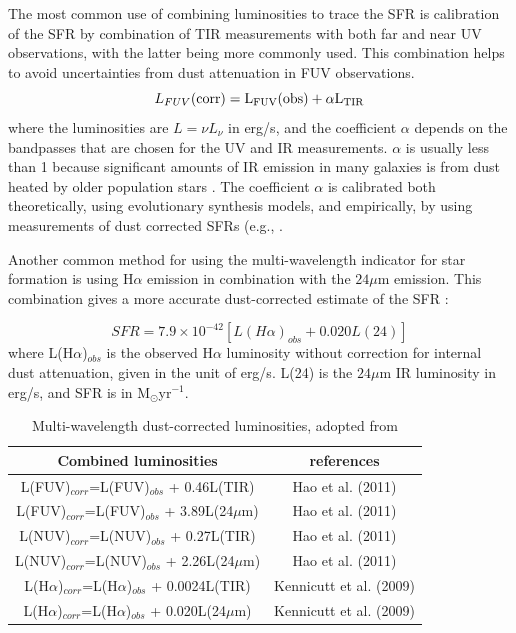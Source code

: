 The most common use of combining luminosities to trace the SFR is calibration of the SFR by combination of TIR measurements with both far and near UV observations, with the latter being more commonly used. This combination helps to avoid uncertainties from dust attenuation in FUV observations.
\begin{equation}
L_{FUV}(\rm corr) = L_{FUV}(\rm obs) + \alpha L_{\rm TIR}
\end{equation}
where the luminosities are $L = \nu L_{\nu}$ in erg/s, and the coefficient $\alpha$ depends on the bandpasses that are chosen for the UV and IR measurements. $\alpha$ is usually less than 1 because significant amounts of IR emission in many galaxies is from dust heated by older population stars \citep{Kennicutt12}. The coefficient $\alpha$ is calibrated both theoretically, using evolutionary synthesis models, and empirically, by using measurements of dust corrected SFRs (e.g., \cite{Hao11}. 

Another common method for using the multi-wavelength indicator for star formation is using H${\alpha}$ emission in combination with the $24\mu$m emission. This combination gives a more accurate dust-corrected estimate of the SFR \citep{Kennicutt09}:

\begin{equation} 
\label{equ: halphaplus24}
SFR = 7.9 \times 10^{-42}[L(H{\alpha})_{obs} + 0.020L(24)]
\end{equation}
where L(H${\alpha}$)$_{obs}$ is the observed H${\alpha}$ luminosity without correction for internal dust attenuation, given in the unit of erg/s. L(24) is the $24\mu$m IR luminosity in erg/s, and SFR is in M$_{\odot}$yr$^{-1}$.

\begin{table}[ht]
\caption{Multi-wavelength dust-corrected luminosities, adopted from \cite{Kennicutt12} \label{table3}}
\centering
\begin{tabular}{ c c}
\hline\hline
Combined luminosities\footnotemark{} & references\\
\hline
L(FUV)$_{corr}$=L(FUV)$_{obs}$ + 0.46L(TIR)& Hao et al. (2011)\\
L(FUV)$_{corr}$=L(FUV)$_{obs}$ + 3.89L(24$\mu$m)& Hao et al. (2011)\\
L(NUV)$_{corr}$=L(NUV)$_{obs}$ + 0.27L(TIR)& Hao et al. (2011)\\
L(NUV)$_{corr}$=L(NUV)$_{obs}$ + 2.26L(24$\mu$m)& Hao et al. (2011)\\
L(H$\alpha$)$_{corr}$=L(H$\alpha$)$_{obs}$ + 0.0024L(TIR)& Kennicutt et al. (2009)\\
L(H$\alpha$)$_{corr}$=L(H$\alpha$)$_{obs}$ + 0.020L(24$\mu$m)& Kennicutt et al. (2009)\\
\hline
\end{tabular}
\end{table}  
 
